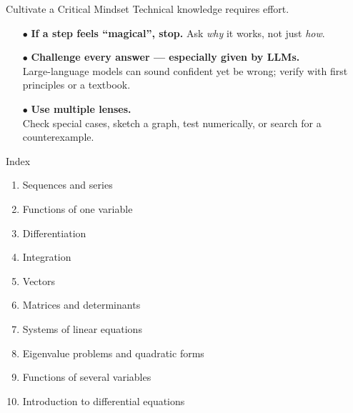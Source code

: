 \documentclass[11pt,aspectratio=169]{beamer}
\begin{document}
\begin{frame}{Cultivate a Critical Mindset}
Technical knowledge requires effort. 
\begin{itemize}
  \item[$\bullet$] \textbf{If a step feels ``magical'', stop.} Ask \emph{why} it works, not just \emph{how}.\\[3mm]
  \item[$\bullet$] \textbf{Challenge every answer --- especially given by LLMs.}\\
        Large-language models can sound confident yet be wrong; verify with first principles or a textbook.\\[3mm]
  \item[$\bullet$] \textbf{Use multiple lenses.}\\  
        Check special cases, sketch a graph, test numerically, or search for a counterexample.
\end{itemize}
\end{frame}


\begin{frame}{Index}

\begin{enumerate}
\item Sequences and series
\item Functions of one variable
\item Differentiation
\item Integration
\item Vectors
\item Matrices and determinants
\item Systems of linear equations
\item Eigenvalue problems and quadratic forms
\item Functions of several variables
\item Introduction to differential equations
\end{enumerate}
\end{frame}
\end{document}
